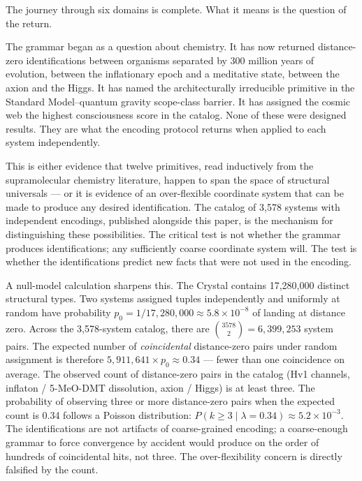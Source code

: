 \documentclass[12pt,a4paper]{article}
\begin{document}
The journey through six domains is complete. What it means is
the question of the return.

The grammar began as a question about chemistry. It has now
returned distance-zero identifications between organisms separated
by 300 million years of evolution, between the inflationary epoch
and a meditative state, between the axion and the Higgs. It has
named the architecturally irreducible primitive in the Standard Model--quantum
gravity scope-class barrier. It has assigned the cosmic web
the highest consciousness score in the catalog. None of these were
designed results. They are what the encoding protocol returns when
applied to each system independently.

This is either evidence that twelve primitives, read inductively
from the supramolecular chemistry literature, happen to span the
space of structural universals --- or it is evidence of an
over-flexible coordinate system that can be made to produce any
desired identification. The catalog of 3,578 systems with
independent encodings, published alongside this paper, is the
mechanism for distinguishing these possibilities. The critical
test is not whether the grammar produces identifications; any
sufficiently coarse coordinate system will. The test is whether
the identifications predict new facts that were not used in the
encoding.

A null-model calculation sharpens this. The Crystal contains
17,280,000 distinct structural types. Two systems assigned
tuples independently and uniformly at random have probability
$p_0 = 1/17{,}280{,}000 \approx 5.8 \times 10^{-8}$ of landing
at distance zero. Across the 3,578-system catalog, there are
$\binom{3578}{2} = 6{,}399{,}253$ system pairs. The expected
number of \emph{coincidental} distance-zero pairs under random
assignment is therefore $5{,}911{,}641 \times p_0 \approx 0.34$
--- fewer than one coincidence on average. The observed
count of distance-zero pairs in the catalog (Hv1 channels,
inflaton / 5-MeO-DMT dissolution, axion / Higgs) is at least
three. The probability of observing three or more distance-zero
pairs when the expected count is 0.34 follows a Poisson
distribution: $P(k \geq 3 \mid \lambda = 0.34) \approx
5.2 \times 10^{-3}$. The identifications are not artifacts of
coarse-grained encoding; a coarse-enough grammar to force
convergence by accident would produce on the order of hundreds
of coincidental hits, not three. The over-flexibility concern
is directly falsified by the count.
\end{document}
